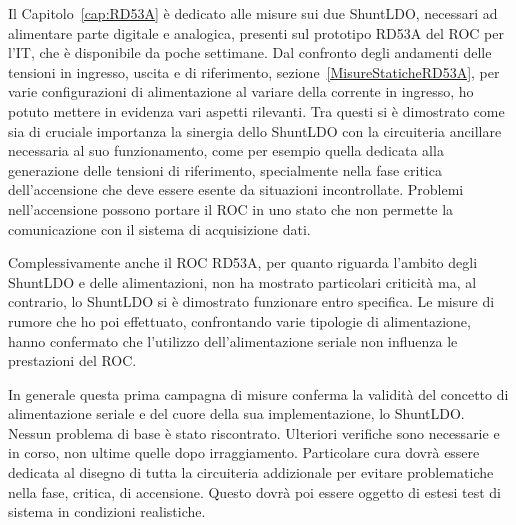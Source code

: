 Il Capitolo~\ref{cap:RD53A} \`e dedicato alle misure sui due ShuntLDO, necessari ad alimentare parte digitale e analogica, presenti sul prototipo RD53A del ROC per l'IT, che \`e disponibile da poche settimane.
Dal confronto degli andamenti delle tensioni in ingresso, uscita e di riferimento, sezione~\ref{MisureStaticheRD53A}, per varie configurazioni di alimentazione 
al variare della corrente in ingresso, ho potuto mettere in evidenza vari aspetti rilevanti. Tra questi si \`e dimostrato come sia di cruciale importanza la sinergia dello ShuntLDO con la circuiteria ancillare necessaria al suo funzionamento, come per esempio quella dedicata alla generazione delle tensioni di riferimento, specialmente nella fase critica dell'accensione che deve essere esente da situazioni incontrollate. Problemi nell'accensione possono portare il ROC in uno stato che non permette la comunicazione con il sistema di acquisizione dati.

Complessivamente anche il ROC RD53A, per quanto riguarda l'ambito degli ShuntLDO e delle alimentazioni, non ha mostrato particolari criticità ma, al contrario, lo ShuntLDO si \`e dimostrato funzionare entro specifica. Le misure di rumore che ho poi effettuato, confrontando varie tipologie di alimentazione, hanno confermato che l'utilizzo dell'alimentazione seriale non influenza le prestazioni del ROC.

In generale questa prima campagna di misure conferma la validità del concetto di alimentazione seriale e del cuore della sua implementazione, lo ShuntLDO. Nessun problema di base \`e stato riscontrato. Ulteriori verifiche sono necessarie e in corso, non ultime quelle dopo irraggiamento. Particolare cura dovr\`a essere dedicata al disegno di tutta la circuiteria addizionale per evitare problematiche nella fase, critica, di accensione. Questo dovrà poi essere oggetto di estesi test di sistema in condizioni realistiche.




